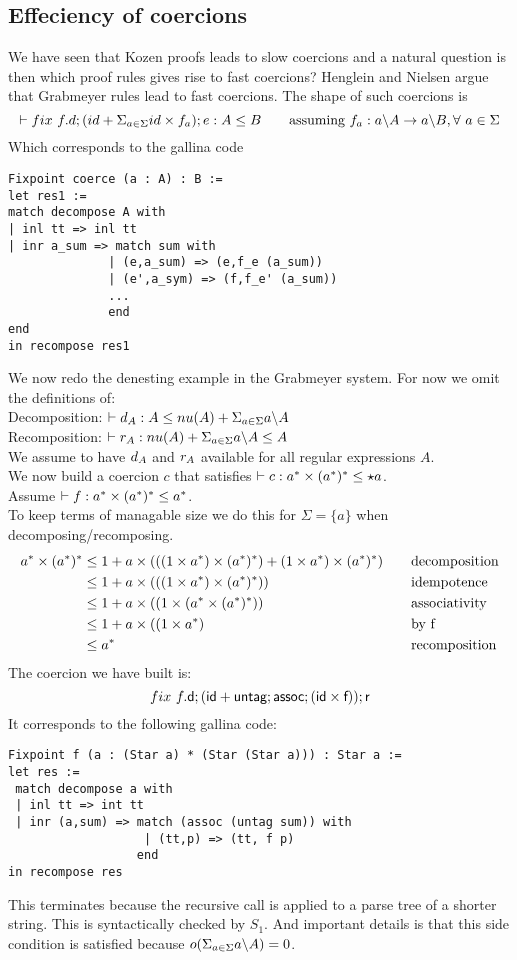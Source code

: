 \documentclass[a4paper,UKenglish,cleveref, autoref, thm-restate]{lipics-v2021}
\begin{document}
\subsection{Effeciency of coercions}
We have seen that Kozen proofs leads to slow coercions and a natural question is then which proof rules gives rise to fast coercions? Henglein and Nielsen argue that Grabmeyer rules lead to fast coercions. The shape of such coercions is
\[
\contains{}{\fix ~f.d;(id + \Sigma_{a \in \Sigma} id\times f_a); e}{A}{B} \qquad \text{assuming }f_a : \derive{a}{A} \rightarrow \derive{a}{B}, \forall ~ a \in \Sigma \]
Which corresponds to the gallina code
\begin{verbatim}
Fixpoint coerce (a : A) : B := 
let res1 := 
match decompose A with 
| inl tt => inl tt
| inr a_sum => match sum with 
              | (e,a_sum) => (e,f_e (a_sum))
              | (e',a_sym) => (f,f_e' (a_sum))
              ...
              end 
end 
in recompose res1
\end{verbatim}
We now redo the denesting example in the Grabmeyer system. For now we omit the definitions of:\\
Decomposition: $\contains{}{d_A}{A}{\mynu{A} + \Sigma_{a \in \Sigma} \derive{a}{A}}$\\
Recomposition: $\contains{}{r_A}{\mynu{A} + \Sigma_{a \in \Sigma} \derive{a}{A}}{A}$\\
We assume to have $\dslcomm{d_A}$ and $\dslcomm{r_A}$ available for all regular expressions $A$.\\
We now build a coercion $c$ that satisfies $\contains{}{c}{a^* \times \dstar a}{\star a}$.\\
Assume $\contains{}{f}{a^* \times \dstar a}{a^*}$.\\
To keep terms of managable size we do this for $\Sigma = \{a\}$ when decomposing/recomposing.
\begin{align}
a^*\times ({a^*})^* &\leq 1 + a \times (((1 \times a^*) \times ({a^*})^*) + (1 \times a^*) \times ({a^*})^*) &&\quad \text{decomposition}\\
& \leq 1 + a \times (((1 \times a^*) \times ({a^*})^*)) &&\quad \text{idempotence}\\
&\leq 1 + a \times ((1 \times (a^* \times ({a^*})^*)) &&\quad \text{associativity}\\
& \leq 1 + a \times ((1 \times a^*) &&\quad \text{by f}\\
& \leq a^* && \quad \text{recomposition}
\end{align}
The coercion we have built is:\\
\[ \fix~f. \dslcom{d}; (\dslcom{id} + \dslcom{untag} ; \dslcom{assoc} ; (\dslcom{id} \times \dslcom{f})) ;\dslcom{r} \]
It corresponds to the following gallina code: 
\begin{verbatim}
Fixpoint f (a : (Star a) * (Star (Star a))) : Star a := 
let res := 
 match decompose a with 
 | inl tt => int tt 
 | inr (a,sum) => match (assoc (untag sum)) with 
                   | (tt,p) => (tt, f p)
                  end 
in recompose res
\end{verbatim}
This terminates because the recursive call is applied to a parse tree of a shorter string. This is syntactically checked by $S_1$. And important details is that this side condition is satisfied because $o(\Sigma_{a \in \Sigma} a \backslash A) = 0$.
\end{document}
